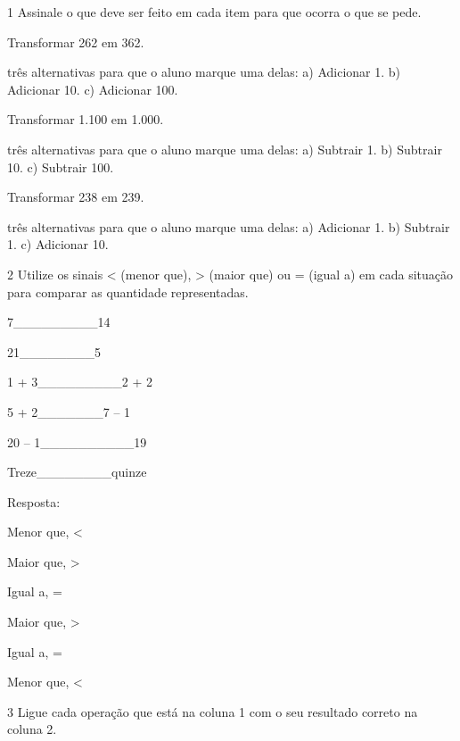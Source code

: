 
\num{1} Assinale o que deve ser feito em cada item para que ocorra o que se pede.

\begin{escolha}

\item
  Transformar 262 em 362.

\Incluir três alternativas para que o aluno marque uma delas: a) Adicionar 1. b) Adicionar 10. c) Adicionar 100.

\item
  Transformar 1.100 em 1.000.

\Incluir três alternativas para que o aluno marque uma delas: a) Subtrair 1. b) Subtrair 10. c) Subtrair 100.

\item
  Transformar 238 em 239.

\Incluir três alternativas para que o aluno marque uma delas: a) Adicionar 1. b) Subtrair 1. c) Adicionar 10.

\num{2} Utilize os sinais \textless{} (menor que), \textgreater{} (maior que) ou
= (igual a) em cada situação para comparar as quantidade representadas.

\begin{escolha}

\item
  7\_\_\_\_\_\_\_\_\_14
\item
  21\_\_\_\_\_\_\_\_5
\item
  1 + 3\_\_\_\_\_\_\_\_\_2 + 2
\item
  5 + 2\_\_\_\_\_\_\_7 -- 1
\item
  20 -- 1\_\_\_\_\_\_\_\_\_\_19
\item
  Treze\_\_\_\_\_\_\_\_quinze
\end{escolha}

Resposta:

\begin{escolha}

\item
  Menor que, \textless{}
\item
  Maior que, \textgreater{}
\item
  Igual a, =
\item
  Maior que, \textgreater{}
\item
  Igual a, =
\item
  Menor que, \textless{}
\end{escolha}

\num{3} Ligue cada operação que está na coluna 1 com o seu resultado correto na coluna 2.


\end{escolha}
